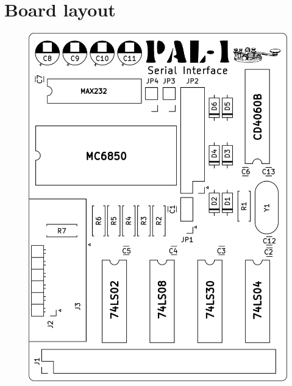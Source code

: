 \documentclass[a4paper,11pt,twoside,openright]{report}
\begin{document}


\chapter{Board layout}
\begin{figure}[h!]
\centering
\includegraphics[scale=2]{figures/serial-brd-1.0a.png}
\end{figure}





\end{document}

